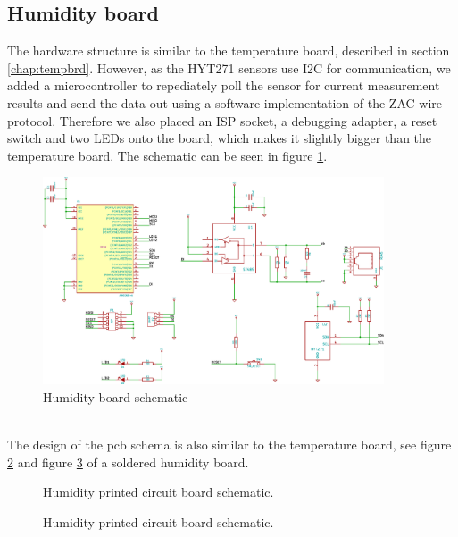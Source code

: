 \documentclass[a4paper]{scrreprt}
\begin{document}
\subsection{Humidity board}
The hardware structure is similar to the temperature board, described in section \ref{chap:tempbrd}. However, as the HYT271 sensors use I2C for
communication, we added a microcontroller to repediately poll the sensor for current measurement results and send the data out using a software
implementation of the ZAC wire protocol. Therefore we also placed an ISP socket, a debugging adapter, a reset switch and two LEDs onto the board, which makes it
slightly bigger than the temperature board. The schematic can be seen in figure \ref{fig:schem_hum}.
\begin{figure}[Hh!]
	\centering
	\includegraphics[width=0.9\textwidth]{img/schem_humidity_board.pdf}
	\caption{Humidity board schematic}
	\label{fig:schem_hum}
\end{figure}
\\
The design of the pcb schema is also similar to the temperature board, see
figure \ref{fig:pcb_hum} and figure \ref{fig:soldered_hum} of a soldered humidity board. 
\begin{figure}[Hh!]
	\centering
	\caption{Humidity printed circuit board schematic.}
	\label{fig:pcb_hum}
\end{figure}
\begin{figure}[Hh!]
	\centering
	\caption{Humidity printed circuit board schematic.}
	\label{fig:soldered_hum}
\end{figure}
\end{document}
